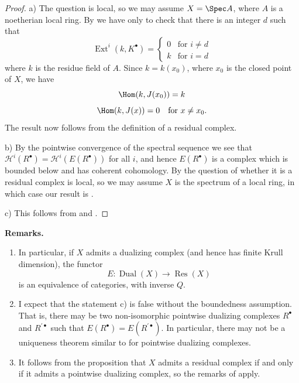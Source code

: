 \begin{proof}
a) The question is local, so we may assume $X=\Spec A$, where $A$ is a noetherian local ring. By  we have only to check that there is an integer $d$ such that
\[
\operatorname{Ext}^{i}(k,K^{\bullet}) = \begin{cases} 0 & \text{for } i\neq d \\ k & \text{for } i = d \end{cases}
\]
where $k$ is the residue field of $A$. Since $k=k(x_0)$, where $x_0$ is the closed point of $X$, we have
\[
\Hom(k, J(x_0)) = k
\]
\[
\Hom(k, J(x)) = 0 \quad\text{for } x\neq x_0.
\]
The result now follows from the definition of a residual complex.

\noindent b) By the pointwise convergence of the spectral sequence  we see that $\mathcal{H}^{i}(R^{\bullet}) = \mathcal{H}^{i}(E(R^{\bullet}))$ for all $i$, and hence $E(R^{\bullet})$ is a complex which is bounded below and has coherent cohomology. By  the question of whether it is a residual complex is local, so we may assume $X$ is the spectrum of a local ring, in which case our result is .

\noindent c) This follows from  and .
\end{proof}

\par\medskip\noindent\textbf{Remarks.}
\begin{enumerate}
\item In particular, if $X$ admits a dualizing complex (and hence has finite Krull dimension), the functor
\[
E\colon \operatorname{Dual}(X)\longrightarrow \operatorname{Res}(X)
\]
is an equivalence of categories, with inverse $Q$.
\item I expect that the statement c) is false without the boundedness assumption. That is, there may be two non-isomorphic pointwise dualizing complexes $R^\bullet$ and $R^{\prime\bullet}$ such that $E(R^\bullet)=E(R^{\prime\bullet})$. In particular, there may not be a uniqueness theorem similar to  for pointwise dualizing complexes.
\item It follows from the proposition that $X$ admits a residual complex if and only if it admits a pointwise dualizing complex, so the remarks of  apply.
\end{enumerate}
\par\medskip

